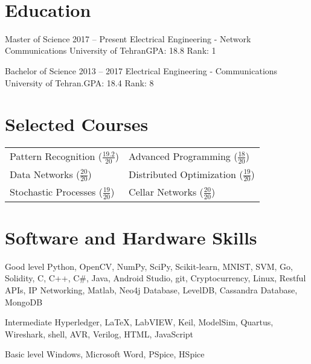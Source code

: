 \documentclass{tccv}
\begin{document}
\textbf{\\}

\section{Education}
\begin{yearlist}
	\item[Master of Science]{2017 -- Present}
	{Electrical Engineering - Network Communications}
	{University of Tehran\newline GPA: 18.8 \newline Rank: 1}
	
	\item[Bachelor of Science]{2013 -- 2017}
	{Electrical Engineering - Communications}
	{University of Tehran.\newline GPA: 18.4 \newline Rank: 8}
\end{yearlist}

\section{Selected Courses}
\begin{tabular}{ll}
	Pattern Recognition ($\frac{19.2}{20}$)	&Advanced Programming ($\frac{18}{20}$) \\
	Data Networks ($\frac{20}{20}$)			&Distributed Optimization ($\frac{19}{20}$) \\
	Stochastic Processes ($\frac{19}{20}$)	&Cellar Networks ($\frac{20}{20}$)
\end{tabular}

\section{Software and Hardware Skills}
\begin{factlist}

\item{Good level}
     {Python, OpenCV, NumPy, SciPy, Scikit-learn, MNIST, SVM, Go, Solidity, C, C++, C\#, Java, Android Studio, git, Cryptocurrency, Linux, Restful APIs, IP Networking, Matlab, Neo4j Database, LevelDB, Cassandra Database, MongoDB}

\item{Intermediate}
     {Hyperledger, \LaTeX, LabVIEW, Keil, ModelSim, Quartus,
     Wireshark, shell, AVR, Verilog, HTML, JavaScript}

\item{Basic level}
     {Windows, Microsoft Word, PSpice, HSpice}

\end{factlist}
\end{document}
